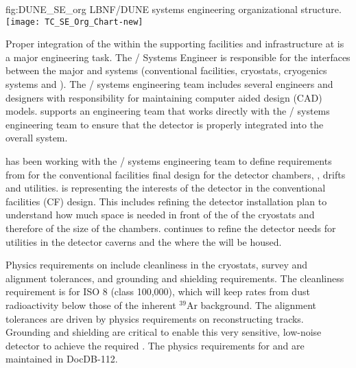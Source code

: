 \begin{dunefigure}{fig:DUNE_SE_org}
  {LBNF/DUNE systems engineering organizational structure.}
   \texttt{[image: TC\_SE\_Org\_Chart-new]}
\end{dunefigure}

Proper integration of the  within the supporting
facilities and infrastructure at \surf is a major engineering task.
The / Systems Engineer is responsible for the
interfaces between the major  and  systems
(conventional facilities, cryostats, cryogenics systems and
). The / systems engineering team
includes several engineers and designers with responsibility for
maintaining computer aided design (CAD) models.  
supports an engineering team that works directly with the
/ systems engineering team to ensure that the
detector is properly integrated into the overall system.

 has been working with the / systems engineering team to
define requirements from  for the conventional facilities final
design for the detector chambers, , drifts
and utilities.  is representing the interests of the  detector
in the conventional facilities (CF) design. This includes refining the
detector installation plan to understand how much space is needed in
front of the  of the cryostats
and therefore of the size of the chambers.  continues to refine the
detector needs for utilities in the detector caverns and the  
where the  will be housed.

Physics requirements on  include cleanliness in the cryostats,
survey and alignment tolerances, and grounding and shielding
requirements. The cleanliness requirement is for ISO 8 (class
100,000), which will keep rates from dust radioactivity below those of
the inherent $^{39}$Ar background. The alignment tolerances are driven
by physics requirements on reconstructing tracks. Grounding and
shielding are critical to enable this very sensitive, low-noise
detector to achieve the required . The physics
requirements for  and  are maintained in
DocDB-112.
